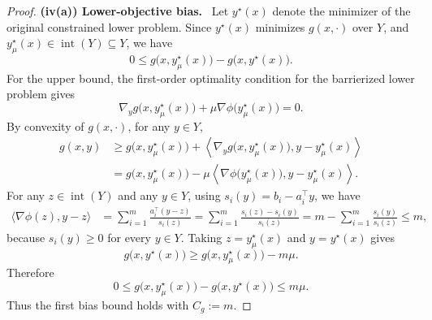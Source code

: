 \documentclass{article}
\newcommand{\proofstep}[1]{\par\smallskip\noindent\textbf{#1}\ }
\begin{document}
\begin{proof}
\proofstep{(iv(a)) Lower-objective bias.}
Let \(y^\star(x)\) denote the minimizer of the original constrained lower problem. Since
\(y^\star(x)\) minimizes \(g(x,\cdot)\) over \(Y\), and
\(y_\mu^\star(x)\in\operatorname{int}(Y)\subseteq Y\), we have
\begin{equation*}
0\le g\bigl(x,y_\mu^\star(x)\bigr)-g\bigl(x,y^\star(x)\bigr).
\end{equation*}
For the upper bound, the first-order optimality condition for the barrierized lower problem gives
\begin{equation*}
\nabla_y g\bigl(x,y_\mu^\star(x)\bigr)
+
\mu\nabla\phi\bigl(y_\mu^\star(x)\bigr)
=
0.
\end{equation*}
By convexity of \(g(x,\cdot)\), for any \(y\in Y\),
\begin{align*}
g(x,y)
&\ge
g\bigl(x,y_\mu^\star(x)\bigr)
+
\left\langle
\nabla_y g\bigl(x,y_\mu^\star(x)\bigr),
y-y_\mu^\star(x)
\right\rangle  \\
&=
g\bigl(x,y_\mu^\star(x)\bigr)
-
\mu
\left\langle
\nabla\phi\bigl(y_\mu^\star(x)\bigr),
y-y_\mu^\star(x)
\right\rangle .
\end{align*}
For any \(z\in\operatorname{int}(Y)\) and any \(y\in Y\), using
\(s_i(y)=b_i-a_i^\top y\), we have
\begin{align*}
\langle\nabla\phi(z),y-z\rangle
&=
\sum_{i=1}^m \frac{a_i^\top(y-z)}{s_i(z)}
=
\sum_{i=1}^m \frac{s_i(z)-s_i(y)}{s_i(z)}
=
m-\sum_{i=1}^m \frac{s_i(y)}{s_i(z)}
\le m,
\end{align*}
because \(s_i(y)\ge0\) for every \(y\in Y\). Taking \(z=y_\mu^\star(x)\) and
\(y=y^\star(x)\) gives
\begin{equation*}
g\bigl(x,y^\star(x)\bigr)
\ge
g\bigl(x,y_\mu^\star(x)\bigr)-m\mu.
\end{equation*}
Therefore
\begin{equation*}
0
\le
g\bigl(x,y_\mu^\star(x)\bigr)-g\bigl(x,y^\star(x)\bigr)
\le
m\mu.
\end{equation*}
Thus the first bias bound holds with \(C_g:=m\).


\end{proof}
\end{document}
